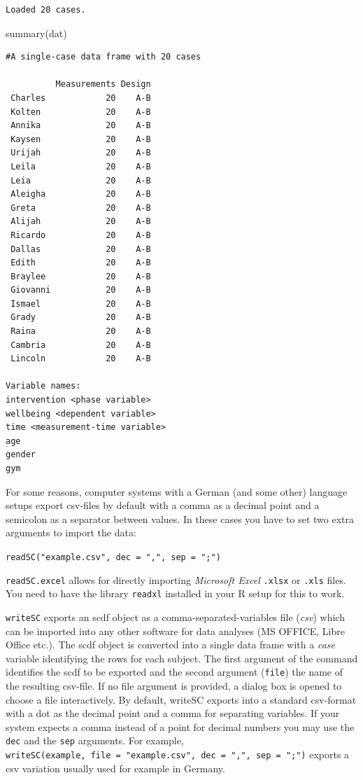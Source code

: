 \documentclass[
]{book}
\newenvironment{Shaded}{\begin{snugshade}}{\end{snugshade}}
\newcommand{\FunctionTok}[1]{\textcolor[rgb]{0.00,0.00,0.00}{#1}}
\newcommand{\NormalTok}[1]{#1}
\begin{document}
\begin{verbatim}
Loaded 20 cases.
\end{verbatim}

\begin{Shaded}
\begin{Highlighting}[]
\FunctionTok{summary}\NormalTok{(dat)}
\end{Highlighting}
\end{Shaded}

\begin{verbatim}
#A single-case data frame with 20 cases

          Measurements Design
 Charles            20    A-B
 Kolten             20    A-B
 Annika             20    A-B
 Kaysen             20    A-B
 Urijah             20    A-B
 Leila              20    A-B
 Leia               20    A-B
 Aleigha            20    A-B
 Greta              20    A-B
 Alijah             20    A-B
 Ricardo            20    A-B
 Dallas             20    A-B
 Edith              20    A-B
 Braylee            20    A-B
 Giovanni           20    A-B
 Ismael             20    A-B
 Grady              20    A-B
 Raina              20    A-B
 Cambria            20    A-B
 Lincoln            20    A-B

Variable names:
intervention <phase variable>
wellbeing <dependent variable>
time <measurement-time variable>
age
gender
gym
\end{verbatim}

For some reasons, computer systems with a German (and some other) language setups export csv-files by default with a comma as a decimal point and a semicolon as a separator between values. In these cases you have to set two extra arguments to import the data:

\texttt{readSC("example.csv",\ dec\ =\ ",",\ sep\ =\ ";")}

\texttt{readSC.excel} allows for directly importing \emph{Microsoft Excel} \texttt{.xlsx} or \texttt{.xls} files. You need to have the library \texttt{readxl} installed in your R setup for this to work.

\texttt{writeSC} exports an scdf object as a comma-separated-variables file (\emph{csv}) which can be imported into any other software for data analyses (MS OFFICE, Libre Office etc.). The scdf object is converted into a single data frame with a \emph{case} variable identifying the rows for each subject. The first argument of the command identifies the scdf to be exported and the second argument (\texttt{file}) the name of the resulting csv-file. If no file argument is provided, a dialog box is opened to choose a file interactively. By default, writeSC exports into a standard csv-format with a dot as the decimal point and a comma for separating variables. If your system expects a comma instead of a point for decimal numbers you may use the \texttt{dec} and the \texttt{sep} arguments. For example, \texttt{writeSC(example,\ file\ =\ "example.csv",\ dec\ =\ ",",\ sep\ =\ ";")} exports a csv variation usually used for example in Germany.
\end{document}
